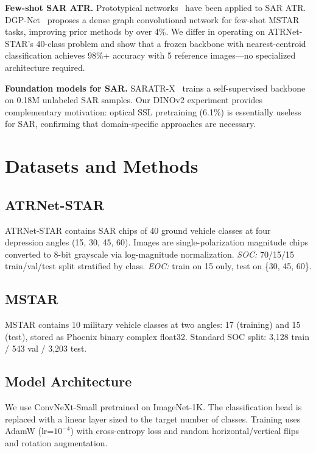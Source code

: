 \documentclass[journal]{IEEEtran}
\begin{document}
\textbf{Few-shot SAR ATR.} Prototypical networks~\cite{proto} have been
applied to SAR ATR. DGP-Net~\cite{dgpnet} proposes a dense graph convolutional
network for few-shot MSTAR tasks, improving prior methods by over 4\%. We
differ in operating on ATRNet-STAR's 40-class problem and show that a frozen
backbone with nearest-centroid classification achieves 98\%+ accuracy with 5
reference images---no specialized architecture required.

\textbf{Foundation models for SAR.} SARATR-X~\cite{sarx} trains a
self-supervised backbone on 0.18M unlabeled SAR samples. Our DINOv2
experiment provides complementary motivation: optical SSL pretraining (6.1\%)
is essentially useless for SAR, confirming that domain-specific approaches are
necessary.

\section{Datasets and Methods}

\subsection{ATRNet-STAR}
ATRNet-STAR contains SAR chips of 40 ground vehicle classes at four depression
angles (15\textdegree, 30\textdegree, 45\textdegree, 60\textdegree). Images
are single-polarization magnitude chips converted to 8-bit grayscale via
log-magnitude normalization. \textit{SOC:} 70/15/15 train/val/test split
stratified by class. \textit{EOC:} train on 15\textdegree{} only, test on
\{30\textdegree, 45\textdegree, 60\textdegree\}.

\subsection{MSTAR}
MSTAR contains 10 military vehicle classes at two angles: 17\textdegree{}
(training) and 15\textdegree{} (test), stored as Phoenix binary complex
float32. Standard SOC split: 3,128 train / 543 val / 3,203 test.

\subsection{Model Architecture}
We use ConvNeXt-Small pretrained on ImageNet-1K. The classification head is
replaced with a linear layer sized to the target number of classes. Training
uses AdamW (lr=$10^{-4}$) with cross-entropy loss and random
horizontal/vertical flips and rotation augmentation.
\end{document}
